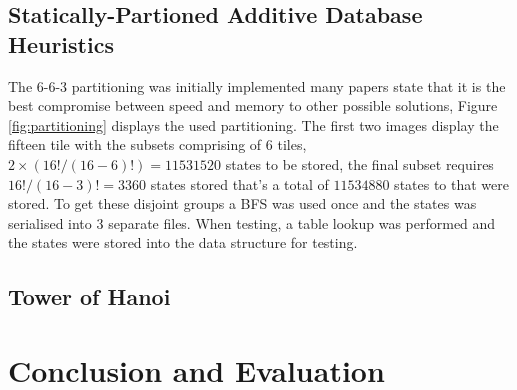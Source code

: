 \documentclass[final]{cmpreport}
\begin{document}
\subsection{Statically-Partioned Additive Database Heuristics}
The 6-6-3 partitioning  was initially implemented many papers state that it is the best compromise between speed and memory to other possible solutions, Figure \ref{fig:partitioning} displays the used partitioning. The first two images display the fifteen tile with the subsets comprising of 6 tiles, $2\times(16!/(16-6)!)= 11531520$ states to be stored, the final subset requires $16!/(16-3)!=3360$ states stored that's a total of $11534880$ states to that were stored. To get these disjoint groups a BFS was used once and the states was serialised into 3 separate files. When testing, a table lookup was performed and the states were stored into the data structure for testing.

\subsection{Tower of Hanoi}

\section{Conclusion and Evaluation}
\clearpage



\appendix
\clearpage
\end{document}

